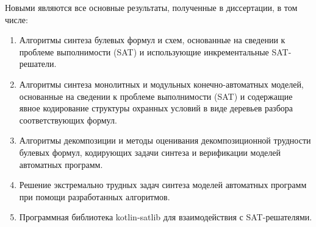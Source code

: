 \novelty
%
Новыми являются все основные результаты, полученные в диссертации, в том числе:
\begin{enumerate}[beginpenalty=10000]
    \item Алгоритмы синтеза булевых формул и схем, основанные на сведении к проблеме выполнимости (SAT) и использующие инкрементальные SAT-решатели.

    \item Алгоритмы синтеза монолитных и модульных конечно-автоматных моделей, основанные на сведении к проблеме выполнимости (SAT) и содержащие явное кодирование структуры охранных условий в виде деревьев разбора соответствующих формул.

    \item Алгоритмы декомпозиции и методы оценивания декомпозиционной трудности булевых формул, кодирующих задачи синтеза и верификации моделей автоматных программ.

    \item Решение экстремально трудных задач синтеза моделей автоматных программ при помощи разработанных алгоритмов.

    \item Программная библиотека kotlin-satlib для взаимодействия с SAT-решателями.
\end{enumerate}



